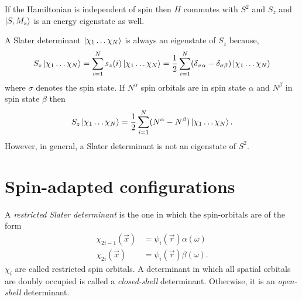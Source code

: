 If the Hamiltonian is independent of spin then $H$ commutes with $S^2$ and $S_z$
and $\ket{S, M_s}$ is an energy eigenstate as well.

A Slater determinant $\ket{\chi_1\ldots\chi_N}$ is always an eigenstate of $S_z$
because,
\[
S_z\ket{\chi_1\ldots\chi_N} = \sum_{i=1}^Ns_z(i)\ket{\chi_1\ldots\chi_N} =
\frac{1}{2}\sum_{i=1}^N(\delta_{\sigma\alpha} - \delta_{\sigma\beta})
\ket{\chi_1\ldots\chi_N}
\]
where $\sigma$ denotes the spin state. If $N^\alpha$ spin orbitals are in
spin state $\alpha$ and $N^\beta$ in spin state $\beta$ then
\begin{equation}\label{c2e160}
S_z\ket{\chi_1\ldots\chi_N} = \frac{1}{2}\sum_{i=1}^N(N^\alpha - N^\beta)
\ket{\chi_1\ldots\chi_N}.
\end{equation}
However, in general, a Slater determinant is not an eigenstate of $S^2$.

\section{Spin-adapted configurations}
A \emph{restricted Slater determinant} is the one in which the spin-orbitals
are of the form
\begin{equation}\label{c2e161}
\begin{aligned}
\chi_{2i-1}(\vec{x}) &= \psi_i(\vec{r})\alpha(\omega) \\
\chi_{2i}(\vec{x}) &= \psi_i(\vec{r})\beta(\omega).
\end{aligned}
\end{equation}
$\chi_i$ are called restricted spin orbitals. A determinant in which all spatial
orbitals are doubly occupied is called a \emph{closed-shell} determinant. 
Otherwise, it is an \emph{open-shell} determinant.

